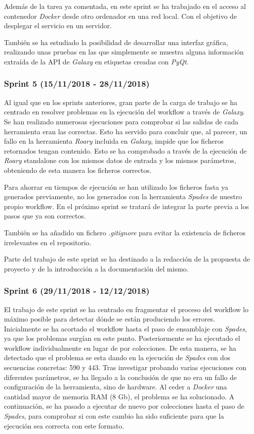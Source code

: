 Además de la tarea ya comentada, en este sprint se ha trabajado en el acceso al contenedor \textit{Docker} desde otro ordenador en una red local. Con el objetivo de desplegar el servicio en un servidor.

También se ha estudiado la posibilidad de desarrollar una interfaz gráfica, realizando unas pruebas en las que simplemente se muestra alguna información extraída de la API de \textit{Galaxy} en etiquetas creadas con \textit{PyQt}.

\subsubsection{Sprint 5 (15/11/2018 - 28/11/2018)}
Al igual que en los sprints anteriores, gran parte de la carga de trabajo se ha centrado en resolver problemas en la ejecución del workflow a través de \textit{Galaxy}. Se han realizado numerosas ejecuciones para comprobar si las salidas de cada herramienta eran las correctas. Esto ha servido para concluir que, al parecer, un fallo en la herramienta \textit{Roary} incluida en \textit{Galaxy}, impide que los ficheros retornados tengan contenido. Esto se ha comprobado a través de la ejecución de \textit{Roary} standalone con los mismos datos de entrada y los mismos parámetros, obteniendo de esta manera los ficheros correctos.

Para ahorrar en tiempos de ejecución se han utilizado los ficheros fasta ya generados previamente, no los generados con la herramienta \textit{Spades} de nuestro propio workflow. En el próximo sprint se tratará de integrar la parte previa a los pasos que ya son correctos.

También se ha añadido un fichero .\textit{gitignore} para evitar la existencia de ficheros irrelevantes en el repositorio.

Parte del trabajo de este sprint se ha destinado a la redacción de la propuesta de proyecto y de la introducción a la documentación del mismo.

\subsubsection{Sprint 6 (29/11/2018 - 12/12/2018)}
El trabajo de este sprint se ha centrado en fragmentar el proceso del workflow lo máximo posible para detectar dónde se están produciendo los errores.
Inicialmente se ha acortado el workflow hasta el paso de ensamblaje con \textit{Spades}, ya que los problemas surgían en este punto. Posteriormente se ha ejecutado el workflow individualmente en lugar de por colecciones. De esta manera, se ha detectado que el problema se esta dando en la ejecución de \textit{Spades} con dos secuencias concretas: 590 y 443. Tras investigar probando varias ejecuciones con diferentes parámetros, se ha llegado a la conclusión de que no era un fallo de configuración de la herramienta, sino de hardware. Al ceder a \textit{Docker} una cantidad mayor de memoria RAM (8 Gb), el problema se ha solucionado. 
A continuación, se ha pasado a ejecutar de nuevo por colecciones hasta el paso de \textit{Spades}, para comprobar si con este cambio ha sido suficiente para que la ejecución sea correcta con este formato. 


